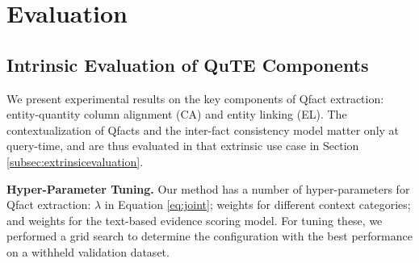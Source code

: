 
\section{Evaluation}

\begin{comment}
We implemented our approach within a system prototype TabQs. A 
preliminary demo of TabQs can be found at\footnote{\textcolor{blue}{\url{http://qute-demo.webredirect.org/table/index.html}}}.
In this section, we demonstrate the results of our experimental evaluation, which focuses on (i) the intrinsic quality of Qfact extraction from web tables and (ii) the extrinsic quality of the end-to-end search system.
\end{comment}

% 
\subsection{Intrinsic Evaluation of 
QuTE Components}
\label{subsec:intrinsicevaluation}

We present experimental results on the key components
of Qfact extraction: entity-quantity column alignment (CA) and
entity linking (EL).
The contextualization of Qfacts and
the inter-fact consistency model matter only
at query-time, and are thus evaluated in that
extrinsic use case in Section \ref{subsec:extrinsicevaluation}.

\vspace{0.1cm}
\noindent \textbf{Hyper-Parameter Tuning.}
Our method has a number of hyper-parameters
for Qfact extraction: $\lambda$ in Equation \ref{eq:joint};
weights
for different context categories; and 
weights for the text-based evidence scoring model.
For tuning these, we performed a grid search to determine the configuration with the best performance on a withheld 
validation dataset.


